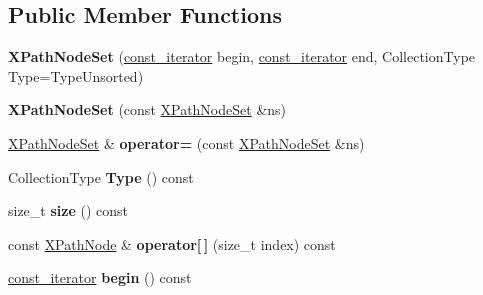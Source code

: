 \subsection*{Public Member Functions}
\begin{DoxyCompactItemize}
\item 
\hypertarget{classphys_1_1xml_1_1XPathNodeSet_a4184ec067744749dd044f7740d2dc6e3}{
{\bfseries XPathNodeSet} (\hyperlink{classphys_1_1xml_1_1XPathNode}{const\_\-iterator} begin, \hyperlink{classphys_1_1xml_1_1XPathNode}{const\_\-iterator} end, CollectionType Type=TypeUnsorted)}
\label{de/dc2/classphys_1_1xml_1_1XPathNodeSet_a4184ec067744749dd044f7740d2dc6e3}

\item 
\hypertarget{classphys_1_1xml_1_1XPathNodeSet_af4ac7af973425828bd66dc278887695c}{
{\bfseries XPathNodeSet} (const \hyperlink{classphys_1_1xml_1_1XPathNodeSet}{XPathNodeSet} \&ns)}
\label{de/dc2/classphys_1_1xml_1_1XPathNodeSet_af4ac7af973425828bd66dc278887695c}

\item 
\hypertarget{classphys_1_1xml_1_1XPathNodeSet_ad2faeaf80e93a3576b10908354adface}{
\hyperlink{classphys_1_1xml_1_1XPathNodeSet}{XPathNodeSet} \& {\bfseries operator=} (const \hyperlink{classphys_1_1xml_1_1XPathNodeSet}{XPathNodeSet} \&ns)}
\label{de/dc2/classphys_1_1xml_1_1XPathNodeSet_ad2faeaf80e93a3576b10908354adface}

\item 
\hypertarget{classphys_1_1xml_1_1XPathNodeSet_aa0a838829715de7b08cd1518c016eb23}{
CollectionType {\bfseries Type} () const }
\label{de/dc2/classphys_1_1xml_1_1XPathNodeSet_aa0a838829715de7b08cd1518c016eb23}

\item 
\hypertarget{classphys_1_1xml_1_1XPathNodeSet_a306178fdaf66f2d0ccefd617f7afc7f3}{
size\_\-t {\bfseries size} () const }
\label{de/dc2/classphys_1_1xml_1_1XPathNodeSet_a306178fdaf66f2d0ccefd617f7afc7f3}

\item 
\hypertarget{classphys_1_1xml_1_1XPathNodeSet_aecd0282913579f27ed0f6de30053f081}{
const \hyperlink{classphys_1_1xml_1_1XPathNode}{XPathNode} \& {\bfseries operator\mbox{[}$\,$\mbox{]}} (size\_\-t index) const }
\label{de/dc2/classphys_1_1xml_1_1XPathNodeSet_aecd0282913579f27ed0f6de30053f081}

\item 
\hypertarget{classphys_1_1xml_1_1XPathNodeSet_abc59bc390d7ac19a1e6cd9d76599c0f6}{
\hyperlink{classphys_1_1xml_1_1XPathNode}{const\_\-iterator} {\bfseries begin} () const }
\label{de/dc2/classphys_1_1xml_1_1XPathNodeSet_abc59bc390d7ac19a1e6cd9d76599c0f6}


\end{DoxyCompactItemize}
